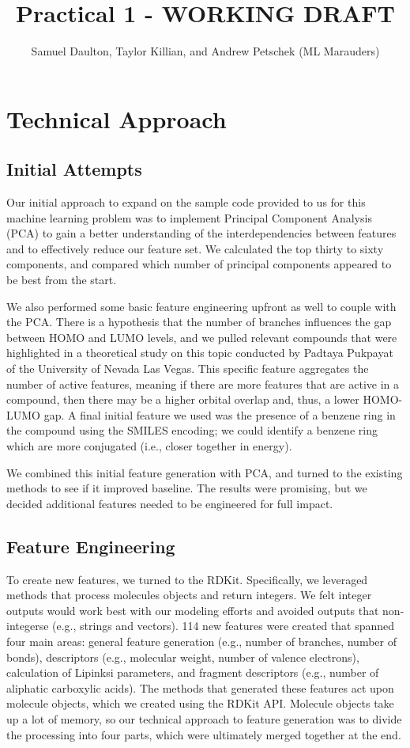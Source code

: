 \documentclass[11pt, oneside]{article}   	%
\title{Practical 1 - WORKING DRAFT}
\author{Samuel Daulton, Taylor Killian, and Andrew Petschek (ML Marauders)}
\begin{document}
\maketitle
\section{Technical Approach}
\subsection{Initial Attempts} 


Our initial approach to expand on the sample code provided to us for this machine learning problem was to implement Principal Component Analysis (PCA) to gain a better understanding of the interdependencies between features and to effectively reduce our feature set. We calculated the top thirty to sixty components, and compared which number of principal components appeared to be best from the start. 

We also performed some basic feature engineering upfront as well to couple with the PCA. There is a hypothesis that the number of branches influences the gap between HOMO and LUMO levels, and we pulled relevant compounds that were highlighted in a theoretical study on this topic conducted by Padtaya Pukpayat of the University of Nevada Las Vegas. This specific feature aggregates the number of active features, meaning if there are more features that are active in a compound, then there may be a higher orbital overlap and, thus, a lower HOMO-LUMO gap. A final initial feature we used was the presence of a benzene ring in the compound using the SMILES encoding; we could identify a benzene ring  which are more conjugated (i.e., closer together in energy). 

We combined this initial feature generation with PCA, and turned to the existing methods to see if it improved baseline. The results were promising, but we decided additional features needed to be engineered for full impact. 

\subsection{Feature Engineering} 

To create new features, we turned to the RDKit. Specifically, we leveraged methods that process molecules objects and return integers. We felt integer outputs would work best with our modeling efforts and avoided outputs that non-integerse (e.g., strings and vectors). 114 new features were created that spanned four main areas: general feature generation (e.g., number of branches, number of bonds), descriptors (e.g., molecular weight, number of valence electrons), calculation of Lipinksi parameters, and fragment descriptors (e.g., number of aliphatic carboxylic acids). The methods that generated these features act upon molecule objects, which we created using the RDKit API. Molecule objects take up a lot of memory, so our technical approach to feature generation was to divide the processing into four parts, which were ultimately merged together at the end. 
\end{document}
